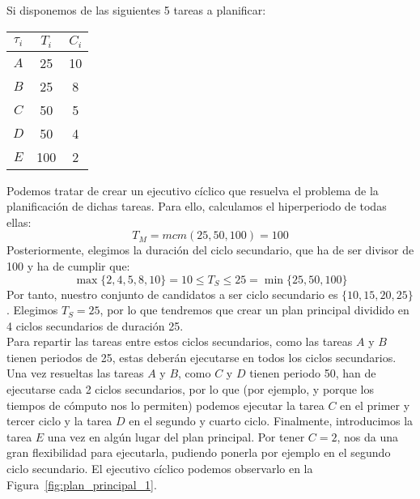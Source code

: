 \begin{ejemplo}
    Si disponemos de las siguientes 5 tareas a planificar:
    \begin{table}[H]
    \centering
    \begin{tabular}{|c|c|c|}
        \hline
        $\tau_i$ & $T_i$ & $C_i$ \\
        \hline
        $A$ & 25 & 10 \\
        \hline
        $B$ & 25 & 8 \\
        \hline
        $C$ & 50 & 5 \\
        \hline
        $D$ & 50 & 4 \\
        \hline
        $E$ & 100 & 2 \\
        \hline
    \end{tabular}
    \end{table}
    Podemos tratar de crear un ejecutivo cíclico que resuelva el problema de la planificación de dichas tareas. Para ello, calculamos el hiperperiodo de todas ellas:
    \begin{equation*}
        T_M = mcm(25, 50, 100) = 100
    \end{equation*}
    Posteriormente, elegimos la duración del ciclo secundario, que ha de ser divisor de 100 y ha de cumplir que:
    \begin{equation*}
        \max\{2,4,5,8,10\} = 10 \leq T_S \leq 25 = \min\{25,50,100\}
    \end{equation*}
    Por tanto, nuestro conjunto de candidatos a ser ciclo secundario es $\{10, 15, 20, 25\}$. Elegimos $T_S = 25$, por lo que tendremos que crear un plan principal dividido en 4 ciclos secundarios de duración 25.\\

    Para repartir las tareas entre estos ciclos secundarios, como las tareas $A$ y $B$ tienen periodos de 25, estas deberán ejecutarse en todos los ciclos secundarios. Una vez resueltas las tareas $A$ y $B$, como $C$ y $D$ tienen periodo 50, han de ejecutarse cada 2 ciclos secundarios, por lo que (por ejemplo, y porque los tiempos de cómputo nos lo permiten) podemos ejecutar la tarea $C$ en el primer y tercer ciclo y la tarea $D$ en el segundo y cuarto ciclo. Finalmente, introducimos la tarea $E$ una vez en algún lugar del plan principal. Por tener $C =2$, nos da una gran flexibilidad para ejecutarla, pudiendo ponerla por ejemplo en el segundo ciclo secundario. El ejecutivo cíclico podemos observarlo en la Figura~\ref{fig:plan_principal_1}.

    \begin{figure}[H]
        \centering
\end{figure}
\end{ejemplo}

